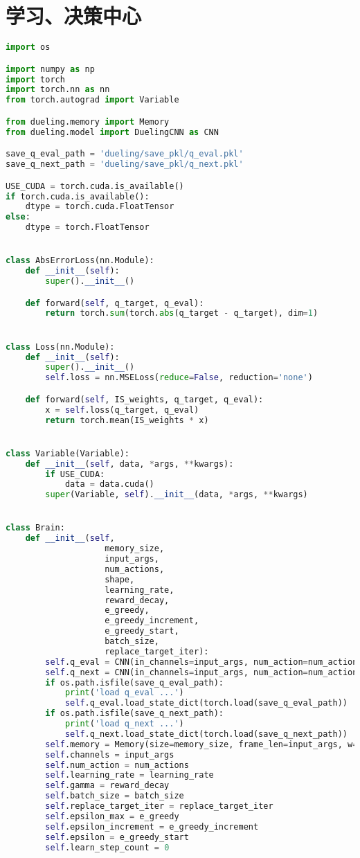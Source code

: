 \section{学习、决策中心}
\begin{lstlisting}[language={python}]
import os

import numpy as np
import torch
import torch.nn as nn
from torch.autograd import Variable

from dueling.memory import Memory
from dueling.model import DuelingCNN as CNN

save_q_eval_path = 'dueling/save_pkl/q_eval.pkl'
save_q_next_path = 'dueling/save_pkl/q_next.pkl'

USE_CUDA = torch.cuda.is_available()
if torch.cuda.is_available():
    dtype = torch.cuda.FloatTensor
else:
    dtype = torch.FloatTensor


class AbsErrorLoss(nn.Module):
    def __init__(self):
        super().__init__()

    def forward(self, q_target, q_eval):
        return torch.sum(torch.abs(q_target - q_target), dim=1)


class Loss(nn.Module):
    def __init__(self):
        super().__init__()
        self.loss = nn.MSELoss(reduce=False, reduction='none')

    def forward(self, IS_weights, q_target, q_eval):
        x = self.loss(q_target, q_eval)
        return torch.mean(IS_weights * x)


class Variable(Variable):
    def __init__(self, data, *args, **kwargs):
        if USE_CUDA:
            data = data.cuda()
        super(Variable, self).__init__(data, *args, **kwargs)


class Brain:
    def __init__(self,
                    memory_size,
                    input_args,
                    num_actions,
                    shape,
                    learning_rate,
                    reward_decay,
                    e_greedy,
                    e_greedy_increment,
                    e_greedy_start,
                    batch_size,
                    replace_target_iter):
        self.q_eval = CNN(in_channels=input_args, num_action=num_actions).type(dtype)
        self.q_next = CNN(in_channels=input_args, num_action=num_actions).type(dtype)
        if os.path.isfile(save_q_eval_path):
            print('load q_eval ...')
            self.q_eval.load_state_dict(torch.load(save_q_eval_path))
        if os.path.isfile(save_q_next_path):
            print('load q_next ...')
            self.q_next.load_state_dict(torch.load(save_q_next_path))
        self.memory = Memory(size=memory_size, frame_len=input_args, w=shape[0], h=shape[1])
        self.channels = input_args
        self.num_action = num_actions
        self.learning_rate = learning_rate
        self.gamma = reward_decay
        self.batch_size = batch_size
        self.replace_target_iter = replace_target_iter
        self.epsilon_max = e_greedy
        self.epsilon_increment = e_greedy_increment
        self.epsilon = e_greedy_start
        self.learn_step_count = 0


\end{lstlisting}
